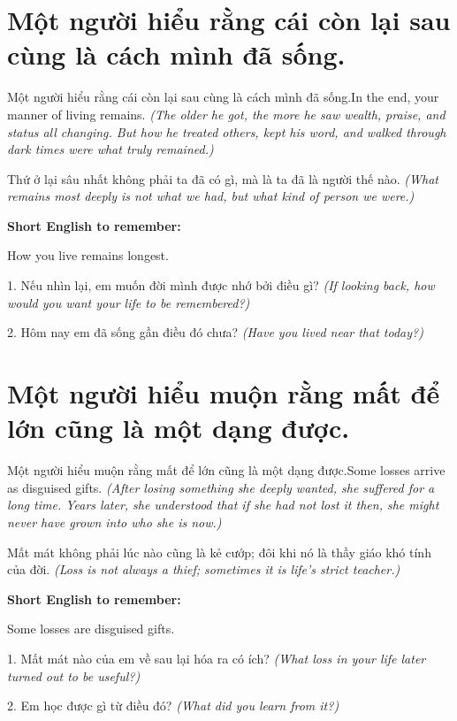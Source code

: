\section{Một người hiểu rằng cái còn lại sau cùng là cách mình đã sống.}
\begin{truyen}{Một người hiểu rằng cái còn lại sau cùng là cách mình đã sống.}{In the end, your manner of living remains.}
\textit{(The older he got, the more he saw wealth, praise, and status all changing. But how he treated others, kept his word, and walked through dark times were what truly remained.)}
\end{truyen}
\begin{baihoc}
Thứ ở lại sâu nhất không phải ta đã có gì, mà là ta đã là người thế nào.
\textit{(What remains most deeply is not what we had, but what kind of person we were.)}
\end{baihoc}
\begin{ghinhoanh}\textbf{Short English to remember:}

How you live remains longest.
\end{ghinhoanh}
\begin{tuhocnhanh}
1. Nếu nhìn lại, em muốn đời mình được nhớ bởi điều gì? \textit{(If looking back, how would you want your life to be remembered?)}

2. Hôm nay em đã sống gần điều đó chưa? \textit{(Have you lived near that today?)}
\end{tuhocnhanh}
\ngancach

\section{Một người hiểu muộn rằng mất để lớn cũng là một dạng được.}
\begin{truyen}{Một người hiểu muộn rằng mất để lớn cũng là một dạng được.}{Some losses arrive as disguised gifts.}
\textit{(After losing something she deeply wanted, she suffered for a long time. Years later, she understood that if she had not lost it then, she might never have grown into who she is now.)}
\end{truyen}
\begin{baihoc}
Mất mát không phải lúc nào cũng là kẻ cướp; đôi khi nó là thầy giáo khó tính của đời.
\textit{(Loss is not always a thief; sometimes it is life's strict teacher.)}
\end{baihoc}
\begin{ghinhoanh}\textbf{Short English to remember:}

Some losses are disguised gifts.
\end{ghinhoanh}
\begin{tuhocnhanh}
1. Mất mát nào của em về sau lại hóa ra có ích? \textit{(What loss in your life later turned out to be useful?)}

2. Em học được gì từ điều đó? \textit{(What did you learn from it?)}
\end{tuhocnhanh}
\ngancach